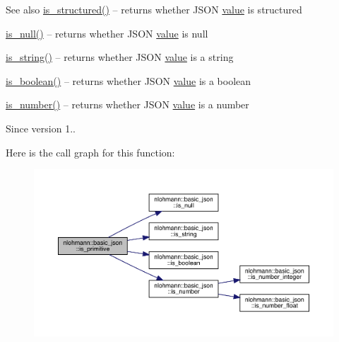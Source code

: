 \begin{DoxySeeAlso}{See also}
\mbox{\hyperlink{classnlohmann_1_1basic__json_a9f68a0af820c3ced7f9d17851ce4c22d}{is\+\_\+structured()}} -- returns whether J\+S\+ON \mbox{\hyperlink{classnlohmann_1_1basic__json_af9c51328fbe1da75eca750be3009917a}{value}} is structured 

\mbox{\hyperlink{classnlohmann_1_1basic__json_a8faa039ca82427ed29c486ffd00600c3}{is\+\_\+null()}} -- returns whether J\+S\+ON \mbox{\hyperlink{classnlohmann_1_1basic__json_af9c51328fbe1da75eca750be3009917a}{value}} is {\ttfamily null} 

\mbox{\hyperlink{classnlohmann_1_1basic__json_a69b596a4a6683b362095c9a139637396}{is\+\_\+string()}} -- returns whether J\+S\+ON \mbox{\hyperlink{classnlohmann_1_1basic__json_af9c51328fbe1da75eca750be3009917a}{value}} is a string 

\mbox{\hyperlink{classnlohmann_1_1basic__json_a943e8cb182d0f2365c76d64b42eaa6fd}{is\+\_\+boolean()}} -- returns whether J\+S\+ON \mbox{\hyperlink{classnlohmann_1_1basic__json_af9c51328fbe1da75eca750be3009917a}{value}} is a boolean 

\mbox{\hyperlink{classnlohmann_1_1basic__json_a2b9852390abb4b1ef5fac6984e2fc0f3}{is\+\_\+number()}} -- returns whether J\+S\+ON \mbox{\hyperlink{classnlohmann_1_1basic__json_af9c51328fbe1da75eca750be3009917a}{value}} is a number
\end{DoxySeeAlso}
\begin{DoxySince}{Since}
version 1.. 
\end{DoxySince}
Here is the call graph for this function\+:
\nopagebreak
\begin{figure}[H]
\begin{center}
\leavevmode
\includegraphics[width=350pt]{classnlohmann_1_1basic__json_a6362b88718eb5c6d4fed6a61eed44b95_cgraph}
\end{center}
\end{figure}
